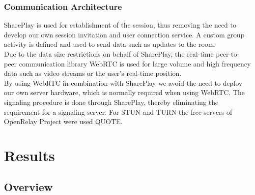 \documentclass{article}
\begin{document}
\subsubsection{Communication Architecture}
SharePlay is used for establishment of the session, thus removing the need to develop our own session invitation and user connection service. A custom group activity is defined and used to send data such as updates to the room.\\
Due to the data size restrictions on behalf of SharePlay, the real-time peer-to-peer communication library WebRTC is used for large volume and high frequency data such as video streams or the user's real-time position.\\ 
By using WebRTC in combination with SharePlay we avoid the need to deploy our own server hardware, which is normally required when using WebRTC. The signaling procedure is done through SharePlay, thereby eliminating the requirement for a signaling server. For STUN and TURN the free servers of OpenRelay Project were used QUOTE.


\section{Results}

\subsection{Overview}
\end{document}
